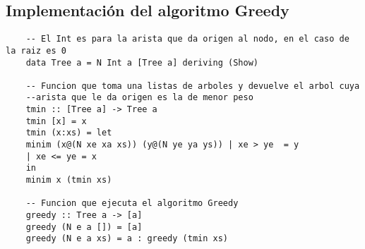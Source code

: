 \documentclass[10pt]{article}
\begin{document}
	\subsection*{Implementaci\'on del algoritmo Greedy}
	\begin{verbatim}
	-- El Int es para la arista que da origen al nodo, en el caso de la raiz es 0
	data Tree a = N Int a [Tree a] deriving (Show)
	
	-- Funcion que toma una listas de arboles y devuelve el arbol cuya
	--arista que le da origen es la de menor peso
	tmin :: [Tree a] -> Tree a
	tmin [x] = x
	tmin (x:xs) = let
	minim (x@(N xe xa xs)) (y@(N ye ya ys)) | xe > ye  = y
	| xe <= ye = x
	in
	minim x (tmin xs) 
	
	-- Funcion que ejecuta el algoritmo Greedy
	greedy :: Tree a -> [a]
	greedy (N e a []) = [a]
	greedy (N e a xs) = a : greedy (tmin xs)
	
	\end{verbatim}
\end{document}
